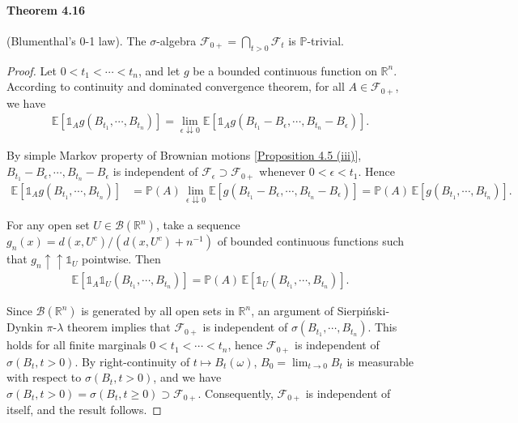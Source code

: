 \documentclass{article}
\numberwithin{equation}{section}
\newcommand{\E}{\mathbb{E}}
\renewcommand{\P}{\mathbb{P}}
\theoremstyle{plain}
\theoremstyle{definition}
\begin{document}
\paragraph{Theorem 4.16\label{thm:4.16}} (Blumenthal's 0-1 law). The $\sigma$-algebra $\mathscr{F}_{0+}=\bigcap_{t>0}\mathscr{F}_t$ is $\P$-trivial.
\begin{proof}
Let $0<t_1<\cdots<t_n$, and let $g$ be a bounded continuous function on $\mathbb{R}^n$. According to continuity and dominated convergence theorem, for all $A\in\mathscr{F}_{0+}$, we have
\begin{align*}
	\E\left[\mathds{1}_A g(B_{t_1},\cdots,B_{t_n})\right] = \lim_{\epsilon\downdownarrows 0}\E\left[\mathds{1}_A g(B_{t_1}-B_\epsilon,\cdots,B_{t_n}-B_\epsilon)\right].
\end{align*}

By simple Markov property of Brownian motions [\hyperref[prop:4.5]{Proposition 4.5 (iii)}], $B_{t_1}-B_\epsilon,\cdots,B_{t_n}-B_\epsilon$ is independent of $\mathscr{F}_\epsilon\supset\mathscr{F}_{0+}$ whenever $0<\epsilon<t_1$. Hence
\begin{align*}
	\E\left[\mathds{1}_A g(B_{t_1},\cdots,B_{t_n})\right]&=\P(A)\,\lim_{\epsilon\downdownarrows 0}\E\left[g(B_{t_1}-B_\epsilon,\cdots,B_{t_n}-B_\epsilon)\right] =\P(A)\,\E[g(B_{t_1},\cdots,B_{t_n})].
\end{align*}

For any open set $U\in\mathscr{B}(\mathbb{R}^n)$, take a sequence $g_n(x)=d(x,U^c)/(d(x,U^c)+n^{-1})$ of bounded continuous functions such that $g_n\uparrow\uparrow\mathds{1}_U$ pointwise. Then
\begin{align*}
\E\left[\mathds{1}_A \mathds{1}_U(B_{t_1},\cdots,B_{t_n})\right]=\P(A)\,\E[\mathds{1}_U(B_{t_1},\cdots,B_{t_n})].
\end{align*}

Since $\mathscr{B}(\mathbb{R}^n)$ is generated by all open sets in $\mathbb{R}^n$, an argument of Sierpiński-Dynkin $\pi$-$\lambda$ theorem implies that $\mathscr{F}_{0+}$ is independent of $\sigma(B_{t_1},\cdots,B_{t_n})$. This holds for all finite marginals $0<t_1<\cdots<t_n$, hence $\mathscr{F}_{0+}$ is independent of $\sigma(B_t,t>0)$. By right-continuity of $t\mapsto B_t(\omega)$, $B_0=\lim_{t\to 0}B_t$ is measurable with respect to $\sigma(B_t,t>0)$, and we have $\sigma(B_t,t>0)=\sigma(B_t,t\geq 0)\supset\mathscr{F}_{0+}$. Consequently, $\mathscr{F}_{0+}$ is independent of itself, and the result follows.
\end{proof}
\end{document}

